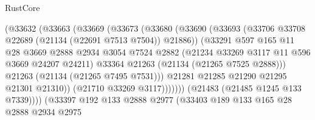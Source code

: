 \begin{lexlean}{RustCore}
\begin{coremodule}
                                    (@33632
                                      (@33663
                                        (@33669
                                          (@33673
                                            (@33680
                                              (@33690
                                                (@33693
                                                  (@33706
                                                    @33708
                                                    @22689
                                                    (@21134 (@22691 @7513 @7504))
                                                    @21886))
                                                (@33291
                                                  @597
                                                  @165
                                                  @11
                                                  @28
                                                  @3669
                                                  @2888
                                                  @2934
                                                  @3054
                                                  @7524
                                                  @2882
                                                  (@21234 @33269 @3117 @11 @596 @3669 @24207 @24211)
                                                  @33364
                                                  @21263
                                                  (@21134 (@21265 @7525 @2888)))
                                                @21263
                                                (@21134 (@21265 @7495 @7531)))
                                              @21281
                                              @21285
                                              @21290
                                              @21295
                                              @21301
                                              @21310))
                                          (@21710 @33269 @3117)))))))
                              (@21483 (@21485 @1245 @133 @7339))))
                          (@33397
                            @192
                            @133
                            @2888
                            @2977
                            (@33403
                              @189
                              @133
                              @165
                              @28
                              @2888
                              @2934
                              @2975

\end{coremodule}
\end{lexlean}
